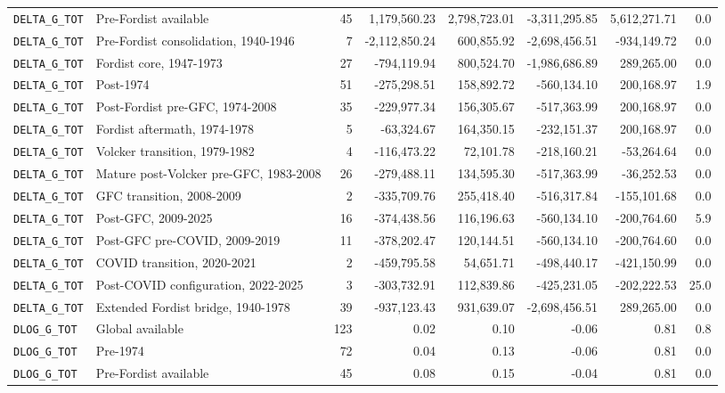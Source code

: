 \begin{landscape}
\begin{longtable}{p{4.4cm}p{3.8cm}rrrrrr}
\nolinkurl{DELTA_G_TOT} & Pre-Fordist available & 45 & 1,179,560.23 & 2,798,723.01 & -3,311,295.85 & 5,612,271.71 & 0.0
\\
\nolinkurl{DELTA_G_TOT} & Pre-Fordist consolidation, 1940-1946 & 7 & -2,112,850.24 & 600,855.92 & -2,698,456.51 & -934,149.72 & 0.0
\\
\nolinkurl{DELTA_G_TOT} & Fordist core, 1947-1973 & 27 & -794,119.94 & 800,524.70 & -1,986,686.89 & 289,265.00 & 0.0
\\
\nolinkurl{DELTA_G_TOT} & Post-1974 & 51 & -275,298.51 & 158,892.72 & -560,134.10 & 200,168.97 & 1.9
\\
\nolinkurl{DELTA_G_TOT} & Post-Fordist pre-GFC, 1974-2008 & 35 & -229,977.34 & 156,305.67 & -517,363.99 & 200,168.97 & 0.0
\\
\nolinkurl{DELTA_G_TOT} & Fordist aftermath, 1974-1978 & 5 & -63,324.67 & 164,350.15 & -232,151.37 & 200,168.97 & 0.0
\\
\nolinkurl{DELTA_G_TOT} & Volcker transition, 1979-1982 & 4 & -116,473.22 & 72,101.78 & -218,160.21 & -53,264.64 & 0.0
\\
\nolinkurl{DELTA_G_TOT} & Mature post-Volcker pre-GFC, 1983-2008 & 26 & -279,488.11 & 134,595.30 & -517,363.99 & -36,252.53 & 0.0
\\
\nolinkurl{DELTA_G_TOT} & GFC transition, 2008-2009 & 2 & -335,709.76 & 255,418.40 & -516,317.84 & -155,101.68 & 0.0
\\
\nolinkurl{DELTA_G_TOT} & Post-GFC, 2009-2025 & 16 & -374,438.56 & 116,196.63 & -560,134.10 & -200,764.60 & 5.9
\\
\nolinkurl{DELTA_G_TOT} & Post-GFC pre-COVID, 2009-2019 & 11 & -378,202.47 & 120,144.51 & -560,134.10 & -200,764.60 & 0.0
\\
\nolinkurl{DELTA_G_TOT} & COVID transition, 2020-2021 & 2 & -459,795.58 & 54,651.71 & -498,440.17 & -421,150.99 & 0.0
\\
\nolinkurl{DELTA_G_TOT} & Post-COVID configuration, 2022-2025 & 3 & -303,732.91 & 112,839.86 & -425,231.05 & -202,222.53 & 25.0
\\
\nolinkurl{DELTA_G_TOT} & Extended Fordist bridge, 1940-1978 & 39 & -937,123.43 & 931,639.07 & -2,698,456.51 & 289,265.00 & 0.0
\\
\nolinkurl{DLOG_G_TOT} & Global available & 123 & 0.02 & 0.10 & -0.06 & 0.81 & 0.8
\\
\nolinkurl{DLOG_G_TOT} & Pre-1974 & 72 & 0.04 & 0.13 & -0.06 & 0.81 & 0.0
\\
\nolinkurl{DLOG_G_TOT} & Pre-Fordist available & 45 & 0.08 & 0.15 & -0.04 & 0.81 & 0.0

\end{longtable}
\end{landscape}
